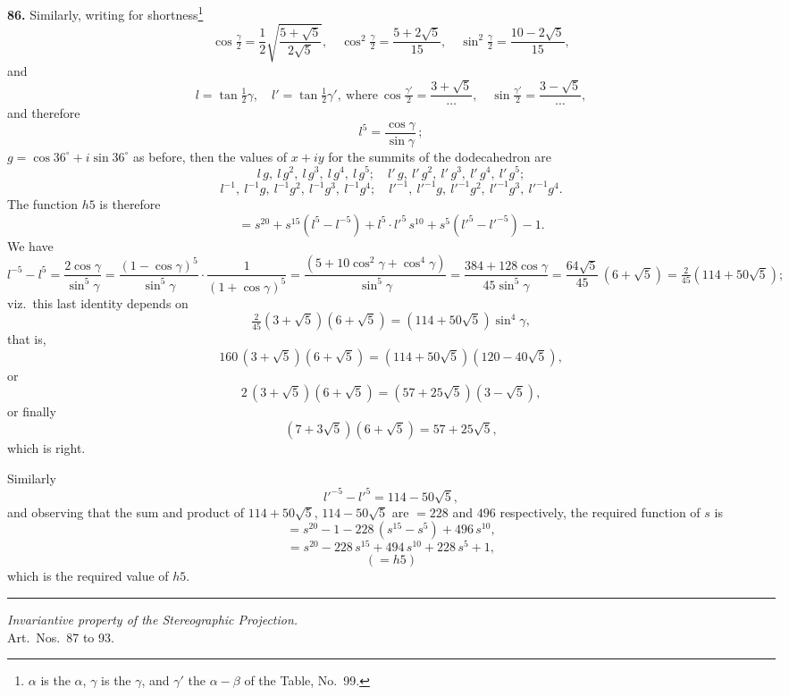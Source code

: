 \documentclass[11pt,a4paper]{article}
\newcommand{\artno}[1]{\textbf{#1.}\quad}
\begin{document}
\artno{86} Similarly, writing for shortness\footnote{$\alpha$ is the
$\alpha$, $\gamma$ is the $\gamma$, and $\gamma'$ the $\alpha - \beta$ of
the Table, No.~99.}
\[
  \cos\tfrac{\gamma}{2} = \frac{1}{2}\sqrt{\frac{5 + \sqrt{5}}{2\sqrt{5}}},\quad
  \cos^{2}\tfrac{\gamma}{2} = \frac{5 + 2\sqrt{5}}{15},\quad
  \sin^{2}\tfrac{\gamma}{2} = \frac{10 - 2\sqrt{5}}{15},
\]
and
\[
  l = \tan\tfrac{1}{2}\gamma,\quad l' = \tan\tfrac{1}{2}\gamma',\ \text{where}\
  \cos\tfrac{\gamma'}{2} = \frac{3 + \sqrt{5}}{\dotsb},\quad
  \sin\tfrac{\gamma'}{2} = \frac{3 - \sqrt{5}}{\dotsb},
\]
and therefore
\[
  l^{5} = \frac{\cos\gamma}{\sin\gamma}\,;
\]
$g = \cos 36^{\circ} + i\sin 36^{\circ}$ as before, then the values of $x + iy$
for the summits of the dodecahedron are
\[
  l\,g,\ l\,g^{2},\ l\,g^{3},\ l\,g^{4},\ l\,g^{5};\quad
  l'\,g,\ l'\,g^{2},\ l'\,g^{3},\ l'\,g^{4},\ l'\,g^{5};
\]
\[
  l^{-1},\ l^{-1} g,\ l^{-1} g^{2},\ l^{-1} g^{3},\ l^{-1} g^{4};\quad
  l'^{-1},\ l'^{-1} g,\ l'^{-1} g^{2},\ l'^{-1} g^{3},\ l'^{-1} g^{4}.
\]
The function $h5$ is therefore
\[
  = s^{20} + s^{15}(l^{5} - l^{-5}) + l^{5}\!\cdot\!l'^{5}\,s^{10}
    + s^{5}(l'^{5} - l'^{-5}) - 1.
\]
We have
\[
  l^{-5} - l^{5} = \frac{2 \cos\gamma}{\sin^{5}\gamma}
   = \frac{(1 - \cos\gamma)^{5}}{\sin^{5}\gamma}\cdot
     \frac{1}{(1 + \cos\gamma)^{5}}
   = \frac{(5 + 10\cos^{2}\gamma + \cos^{4}\gamma)}{\sin^{5}\gamma}
   = \frac{384 + 128 \cos\gamma}{45\sin^{5}\gamma}
   = \frac{64\sqrt{5}}{45}\,(6 + \sqrt{5})
   = \tfrac{2}{45}(114 + 50\sqrt{5});
\]
viz.\ this last identity depends on
\[
  \tfrac{2}{45}(3 + \sqrt{5})(6 + \sqrt{5}) = (114 + 50\sqrt{5})\sin^{4}\gamma,
\]
that is,
\[
  160\,(3 + \sqrt{5})(6 + \sqrt{5}) = (114 + 50\sqrt{5})(120 - 40\sqrt{5}),
\]
or
\[
  2\,(3 + \sqrt{5})(6 + \sqrt{5}) = (57 + 25\sqrt{5})(3 - \sqrt{5}),
\]
or finally
\[
  (7 + 3\sqrt{5})(6 + \sqrt{5}) = 57 + 25\sqrt{5},
\]
which is right.

Similarly
\[
  l'^{-5} - l'^{5} = 114 - 50\sqrt{5},
\]
and observing that the sum and product of $114 + 50\sqrt{5}$, $114 - 50\sqrt{5}$
are $=228$ and $496$ respectively, the required function of $s$ is
\[
  = s^{20} - 1 - 228\,(s^{15} - s^{5}) + 496\,s^{10},
\]
\[
  = s^{20} - 228\,s^{15} + 494\,s^{10} + 228\,s^{5} + 1,
\]
\[
  (= h5)
\]
which is the required value of $h5$.

\bigskip
\hrule height 0pt
\bigskip

\begin{center}
\textit{Invariantive property of the Stereographic Projection.}\\
Art.\ Nos.\ 87 to 93.
\end{center}
\end{document}
